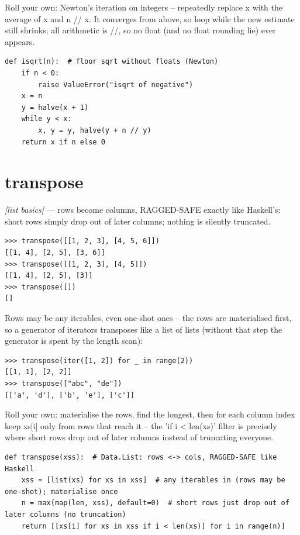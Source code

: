 \documentclass[11pt,letterpaper]{book}
\begin{document}
Roll your own: Newton's iteration on integers -- repeatedly replace x with the average of x and n // x. It converges from above, so loop while the new estimate still shrinks; all arithmetic is //, so no float (and no float rounding lie) ever appears.

\begin{lstlisting}[style=code]
def isqrt(n):  # floor sqrt without floats (Newton)
    if n < 0:
        raise ValueError("isqrt of negative")
    x = n
    y = halve(x + 1)
    while y < x:
        x, y = y, halve(y + n // y)
    return x if n else 0
\end{lstlisting}

\section{transpose}
\noindent\textit{[list basics]} --- rows become columns, RAGGED-SAFE exactly like Haskell's: short rows simply drop out of later columns; nothing is silently truncated.
\begin{lstlisting}[style=spec]
>>> transpose([[1, 2, 3], [4, 5, 6]])
[[1, 4], [2, 5], [3, 6]]
>>> transpose([[1, 2, 3], [4, 5]])
[[1, 4], [2, 5], [3]]
>>> transpose([])
[]
\end{lstlisting}

Rows may be any iterables, even one-shot ones -- the rows are materialised first, so a generator of iterators transposes like a list of lists (without that step the generator is spent by the length scan):

\begin{lstlisting}[style=spec]
>>> transpose(iter([1, 2]) for _ in range(2))
[[1, 1], [2, 2]]
>>> transpose(["abc", "de"])
[['a', 'd'], ['b', 'e'], ['c']]
\end{lstlisting}

Roll your own: materialise the rows, find the longest, then for each column index keep xs[i] only from rows that reach it -- the 'if i < len(xs)' filter is precisely where short rows drop out of later columns instead of truncating everyone.

\begin{lstlisting}[style=code]
def transpose(xss):  # Data.List: rows <-> cols, RAGGED-SAFE like Haskell
    xss = [list(xs) for xs in xss]  # any iterables in (rows may be one-shot); materialise once
    n = max(map(len, xss), default=0)  # short rows just drop out of later columns (no truncation)
    return [[xs[i] for xs in xss if i < len(xs)] for i in range(n)]
\end{lstlisting}
\end{document}
